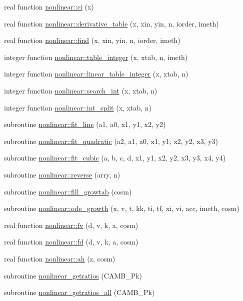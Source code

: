 \begin{DoxyCompactItemize}
\item 
real function \mbox{\hyperlink{namespacenonlinear_a723581002925fb14e73f4d80ce6ee6e5}{nonlinear\+::ci}} (x)
\item 
real function \mbox{\hyperlink{namespacenonlinear_aaa7e906c253a54ffb73bab9e5dfd1397}{nonlinear\+::derivative\+\_\+table}} (x, xin, yin, n, iorder, imeth)
\item 
real function \mbox{\hyperlink{namespacenonlinear_a553c7b86e3fd7c044f3fcef5b77c0a3f}{nonlinear\+::find}} (x, xin, yin, n, iorder, imeth)
\item 
integer function \mbox{\hyperlink{namespacenonlinear_a9982a6cac80109ad36dd796e77f372de}{nonlinear\+::table\+\_\+integer}} (x, xtab, n, imeth)
\item 
integer function \mbox{\hyperlink{namespacenonlinear_a623980d65535bc78bbcf5eb8f701ac42}{nonlinear\+::linear\+\_\+table\+\_\+integer}} (x, xtab, n)
\item 
integer function \mbox{\hyperlink{namespacenonlinear_a210b83a28f6523e35c1b2314bd38ba10}{nonlinear\+::search\+\_\+int}} (x, xtab, n)
\item 
integer function \mbox{\hyperlink{namespacenonlinear_a0241839029c1aa4d429fb9a516577921}{nonlinear\+::int\+\_\+split}} (x, xtab, n)
\item 
subroutine \mbox{\hyperlink{namespacenonlinear_a5754454991f9dfb61c4251267c2d175d}{nonlinear\+::fit\+\_\+line}} (a1, a0, x1, y1, x2, y2)
\item 
subroutine \mbox{\hyperlink{namespacenonlinear_ade72d40a60522b6b609687fbe7e9ddbb}{nonlinear\+::fit\+\_\+quadratic}} (a2, a1, a0, x1, y1, x2, y2, x3, y3)
\item 
subroutine \mbox{\hyperlink{namespacenonlinear_ad34b8f5e3284fe90bf1e2d39ad027cc1}{nonlinear\+::fit\+\_\+cubic}} (a, b, c, d, x1, y1, x2, y2, x3, y3, x4, y4)
\item 
subroutine \mbox{\hyperlink{namespacenonlinear_ac344cab10a5226c8ef0147ff8f96767a}{nonlinear\+::reverse}} (arry, n)
\item 
subroutine \mbox{\hyperlink{namespacenonlinear_af9e22f2a04a3c5dc0f45fcd96c9b28cb}{nonlinear\+::fill\+\_\+growtab}} (cosm)
\item 
subroutine \mbox{\hyperlink{namespacenonlinear_a26b787bf515ef27795b9dbbed39b2e34}{nonlinear\+::ode\+\_\+growth}} (x, v, t, kk, ti, tf, xi, vi, acc, imeth, cosm)
\item 
real function \mbox{\hyperlink{namespacenonlinear_aa6814235c0bd98fe3c05073b03b16fac}{nonlinear\+::fv}} (d, v, k, a, cosm)
\item 
real function \mbox{\hyperlink{namespacenonlinear_a7f8c8180d41c0771e383f7edaa516803}{nonlinear\+::fd}} (d, v, k, a, cosm)
\item 
real function \mbox{\hyperlink{namespacenonlinear_ab5e5d4cd8639004a33671b83480474cd}{nonlinear\+::ah}} (z, cosm)
\item 
subroutine \mbox{\hyperlink{halofit__ppf_8f90_aa86a98d6430a2409729002ab053ce60c}{nonlinear\+\_\+getratios}} (C\+A\+M\+B\+\_\+\+Pk)
\item 
subroutine \mbox{\hyperlink{halofit__ppf_8f90_a2fbb625d05e4aaceec0f8f5ca560af10}{nonlinear\+\_\+getratios\+\_\+all}} (C\+A\+M\+B\+\_\+\+Pk)
\end{DoxyCompactItemize}
